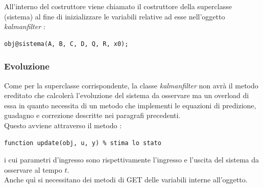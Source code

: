 All'interno del costruttore viene chiamato il costruttore della superclasse (sistema) al fine di inizializzare le variabili relative ad esse nell'oggetto \textit{kalmanfilter} :
\begin{lstlisting}[frame=single]
	obj@sistema(A, B, C, D, Q, R, x0);
\end{lstlisting}

\subsubsection{Evoluzione}
Come per la superclasse corrispondente, la classe \textit{kalmanfilter} non avrà il metodo ereditato che calcolerà l'evoluzione del sistema da osservare ma un overload di essa in quanto necessita di un metodo che implementi le equazioni di predizione, guadagno e correzione descritte nei paragrafi precedenti.\\
Questo avviene attraverso il metodo :
\begin{lstlisting}[frame=single]
function update(obj, u, y) % stima lo stato
\end{lstlisting}
i cui parametri d'ingresso sono rispettivamente l'ingresso e l'uscita del sistema da osservare al tempo $t$.\\
Anche quì si necessitano dei metodi di GET delle variabili interne all'oggetto.
\newpage

